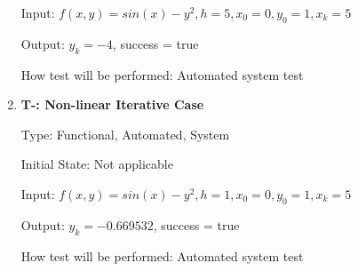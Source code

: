 \documentclass[12pt, titlepage]{article}
\newcounter{tnum} %
\begin{document}
\begin{enumerate}
Input: $f(x, y) = sin(x) - y^2, h = 5, x_0 = 0, y_0 = 1, x_k = 5$
					
Output: $y_k = -4$, success = true
					
How test will be performed: Automated system test

\item{\textbf{T-\thetnum \label{t-euler_nonlineariterative}: Non-linear Iterative Case}}

Type: Functional, Automated, System %
					
Initial State: Not applicable
					
Input: $f(x, y) = sin(x) - y^2, h = 1, x_0 = 0, y_0 = 1, x_k = 5$
					
Output: $y_k = -0.669532$, success = true
					
How test will be performed: Automated system test

\end{enumerate}
\end{document}
